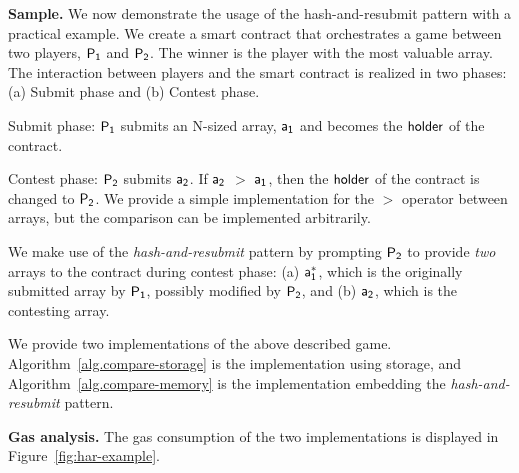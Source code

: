 \noindent \textbf{Sample.} We now demonstrate the usage of the
hash-and-resubmit pattern with a practical example. We create a smart contract
that orchestrates a game between two players, $\mathsf{P_1}$ and $\mathsf{P_2}$. The winner is
the player with the most valuable array. The interaction between players and
the smart contract is realized in two phases: (a) Submit phase and (b) Contest
phase.

\noindent \textsf{Submit phase:} $\mathsf{P_1}$ submits an N-sized array, $\mathsf{a_1}$ and
becomes the $\mathsf{holder}$ of the contract.

\noindent \textsf{Contest phase:} $\mathsf{P_2}$ submits $\mathsf{a_2}$. If $\mathsf{a_2}$ $>$
$\mathsf{a_1}$, then the $\mathsf{holder}$ of the contract is changed to $\mathsf{P_2}$. We provide a
simple implementation for the $>$ operator between arrays, but the comparison
can be implemented arbitrarily.

We make use of the \emph{hash-and-resubmit} pattern by prompting $\mathsf{P_2}$ to
provide \emph{two} arrays to the contract during contest phase: (a) $\mathsf{a_1^*}$,
which is the originally submitted array by $\mathsf{P_1}$, possibly modified by $\mathsf{P_2}$,
and (b) $\mathsf{a_2}$, which is the contesting array.

We provide two implementations of the above described game.
Algorithm~\ref{alg.compare-storage} is the implementation using storage, and
Algorithm~\ref{alg.compare-memory} is the implementation embedding the
\emph{hash-and-resubmit} pattern.



\noindent \textbf{Gas analysis.} The gas consumption of the two implementations
is displayed in Figure~\ref{fig:har-example}.

